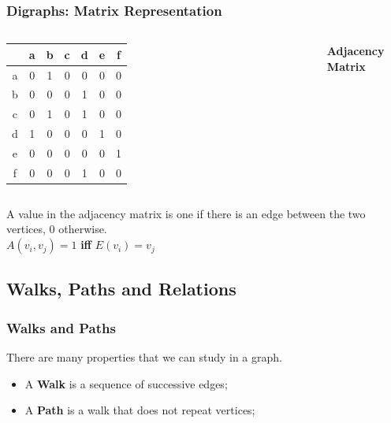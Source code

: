 \documentclass{beamer}
\begin{document}
\begin{frame}
  \frametitle{Digraphs: Matrix Representation}

  \begin{columns}

    {\larger
      \begin{tabular}{c|cccccc}
        & a & b & c & d & e & f \\
        \hline
        a &0&1&0&0&0&0\\
        b &0&0&0&1&0&0\\
        c &0&1&0&1&0&0\\
        d &1&0&0&0&1&0\\
        e &0&0&0&0&0&1\\
        f &0&0&0&1&0&0\\
      \end{tabular}
    }

    \bigskip

    \begin{center}{\bf Adjacency Matrix}\end{center}
  \end{columns}
  \bigskip

  A value in the adjacency matrix is one if there is an edge between
  the two vertices, 0 otherwise.\\
  \hfill$A(v_i,v_j) = 1$ {\bf iff} $E(v_i) = v_j$
\end{frame}

\subsection{Walks, Paths and Relations}

\begin{frame}
  \frametitle{Walks and Paths}

  There are many properties that we can study in a graph.
  \bigskip

  \begin{itemize}
    \item A {\bf Walk} is a sequence of successive edges;\\

    \bigskip
    \item A {\bf Path} is a walk that does not repeat vertices;\\
  \end{itemize}

\end{frame}
\end{document}
